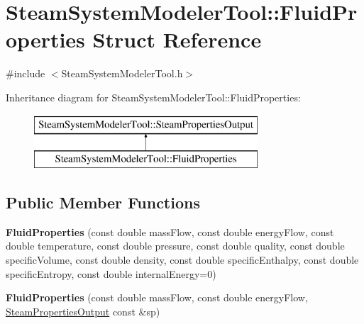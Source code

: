 \hypertarget{struct_steam_system_modeler_tool_1_1_fluid_properties}{}\section{Steam\+System\+Modeler\+Tool\+:\+:Fluid\+Properties Struct Reference}
\label{struct_steam_system_modeler_tool_1_1_fluid_properties}


{\ttfamily \#include $<$Steam\+System\+Modeler\+Tool.\+h$>$}

Inheritance diagram for Steam\+System\+Modeler\+Tool\+:\+:Fluid\+Properties\+:\begin{figure}[H]
\begin{center}
\leavevmode
\includegraphics[height=2.000000cm]{d9/dd3/struct_steam_system_modeler_tool_1_1_fluid_properties}
\end{center}
\end{figure}
\subsection*{Public Member Functions}
\begin{DoxyCompactItemize}
\item 
\mbox{\label{struct_steam_system_modeler_tool_1_1_fluid_properties_a6ce10a13b6d676cc1c00fb3fd6712f4b}} 
{\bfseries Fluid\+Properties} (const double mass\+Flow, const double energy\+Flow, const double temperature, const double pressure, const double quality, const double specific\+Volume, const double density, const double specific\+Enthalpy, const double specific\+Entropy, const double internal\+Energy=0)
\item 
\mbox{\label{struct_steam_system_modeler_tool_1_1_fluid_properties_a46758e1dccf1da39bb2924ad13afa470}} 
{\bfseries Fluid\+Properties} (const double mass\+Flow, const double energy\+Flow, \hyperlink{struct_steam_system_modeler_tool_1_1_steam_properties_output}{Steam\+Properties\+Output} const \&sp)
\end{DoxyCompactItemize}
